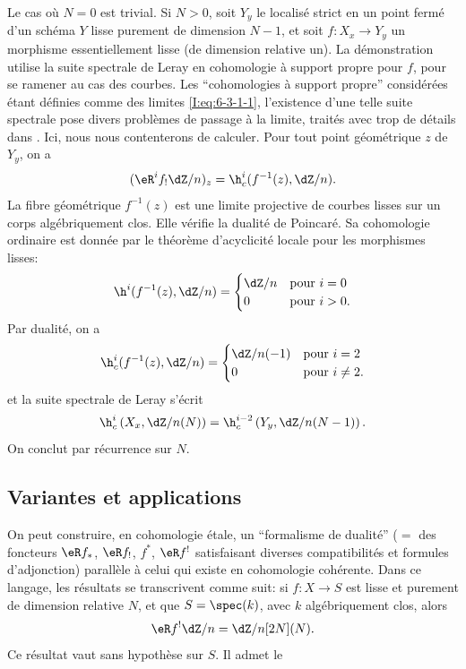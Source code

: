 Le cas où $N=0$ est trivial. Si $N>0$, soit $Y_y$ le localisé strict en un 
point fermé d'un schéma $Y$ lisse purement de dimension $N-1$, et soit 
$f:X_x\to Y_y$ un morphisme essentiellement lisse (de dimension relative un). 
La démonstration utilise la suite spectrale de Leray en cohomologie à 
support propre pour $f$, pour se ramener au cas des courbes. Les ``cohomologies 
à support propre'' considérées étant définies comme des limites 
\eqref{I:eq:6-3-1-1}, l'existence d'une telle suite spectrale pose divers 
problèmes de passage à la limite, traités avec trop de détails dans 
\cite[XVIII]{sga4}. Ici, nous nous contenterons de calculer. Pour tout point géométrique $z$ de $Y_y$, on a 
\[
  (\eR^if_! \dZ/n)_z = \h_c^i(f^{-1}(z),\dZ/n) \text{.}
\]
La fibre géométrique $f^{-1}(z)$ est une limite projective de courbes lisses 
sur un corps algébriquement clos. Elle vérifie la dualité de Poincaré. 
Sa cohomologie ordinaire est donnée par le théorème d'acyclicité locale 
pour les morphismes lisses: 
\[
  \h^i(f^{-1}(z),\dZ/n) 
    = \begin{cases}
        \dZ/n & \text{pour $i=0$} \\
        0     & \text{pour $i>0$.}
      \end{cases}
\]
Par dualité, on a 
\[
  \h_c^i(f^{-1}(z),\dZ/n) 
    = \begin{cases}
        \dZ/n(-1) & \text{pour $i=2$} \\
        0         & \text{pour $i\ne 2$.}
      \end{cases}
\]
et la suite spectrale de Leray s'écrit 
\[
  \h_c^i\left(X_x,\dZ/n(N)\right) = \h_c^{i-2}\left(Y_y,\dZ/n(N-1)\right) \text{.}
\]
On conclut par récurrence sur $N$. 










\subsection{Variantes et applications}\label{I:6-4}

On peut construire, en cohomologie étale, un ``formalisme de dualité'' 
($=$ des foncteurs $\eR f_*$, $\eR f_!$, $f^*$, $\eR f^!$ satisfaisant diverses 
compatibilités et formules d'adjonction) parallèle à celui qui existe en 
cohomologie cohérente. Dans ce langage, les résultats  se transcrivent comme suit: si $f:X\to S$ est lisse et purement 
de dimension relative $N$, et que $S=\spec(k)$, avec $k$ algébriquement clos, 
alors 
\[
  \eR f^! \dZ/n = \dZ/n [2N](N) \text{.}
\]
Ce résultat vaut sans hypothèse sur $S$. Il admet le 





